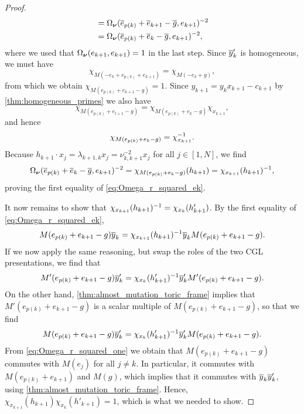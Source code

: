 \begin{proof}
\begin{align*}
		                                         & = \Omega_{\boldsymbol{\nu}}(\overline{e}_{p(k)} + \overline{e}_{k+1} - \overline{g}, e_{k+1})^{-2}        \\
		                                         & = \Omega_{\boldsymbol{\nu}}(\overline{e}_{p(k)} + \overline{e}_k - \overline{g}, e_{k+1})^{-2},
	\end{align*}
	where we used that $\Omega_{\boldsymbol{\nu}}(e_{k+1}, e_{k+1}) = 1$ in the last step. Since
	$\overline{y}'_k$ is homogeneous, we must have
	\begin{equation*}
		\chi_{M(-e_k + e_{p(k)} + e_{k+1})} = \chi_{M(-e_k + g)},
	\end{equation*}
	from which we obtain $\chi_{M(e_{p(k)} + e_{k+1} - g)} = 1$. Since $y_{k+1} = y_k
		x_{k+1} - c_{k+1}$ by \cref{thm:homogeneous_primes} we also have
	\begin{equation*}
		\chi_{M(e_{p(k)} + e_{l+1} -g)} = \chi_{M(e_{p(k)} + e_k - g)}\chi_{x_{k+1}},
	\end{equation*}
	and hence
	\begin{equation*}
		\chi_{M(e_{p(k)} + e_k - g)} = \chi_{x_{k+1}}^{-1}.
	\end{equation*}
	Because $h_{k+1} \cdot x_j = \lambda_{k+1, k} x_j = \nu_{k, k+1}^{-2}x_j$ for all $j
		\in [1, N]$, we find
	\begin{equation*}
		\Omega_{\boldsymbol{\nu}}(\overline{e}_{p(k)}+\overline{e}_k - \overline{g}, e_{k+1})^{-2} = \chi_{M(e_{p(k)} + e_k - g)}(h_{k+1}) = \chi_{x_{k+1}}(h_{k+1})^{-1},
	\end{equation*}
	proving the first equality of \cref{eq:Omega_r_squared_ek}.

	It now remains to show that $\chi_{x_{k+1}}(h_{k+1})^{-1} = \chi_{x_k}(h'_{k+1})$. By
	the first equality of \cref{eq:Omega_r_squared_ek},
	\begin{equation*}
		M(e_{p(k)} + e_{k+1} - g)\overline{y}_k = \chi_{x_{k+1}}(h_{k+1})^{-1} \overline{y}_k M(e_{p(k)} + e_{k+1} - g).
	\end{equation*}
	If we now apply the same reasoning, but swap the roles of the two CGL presentations, we
	find that
	\begin{equation*}
		M'(e_{p(k)} + e_{k+1} - g)\overline{y}'_k = \chi_{x_k}(h'_{k+1})^{-1} \overline{y}'_k M'(e_{p(k)} + e_{k+1} - g).
	\end{equation*}
	On the other hand, \cref{thm:almost_mutation_toric_frame} implies that $M'(e_{p(k)} +
		e_{k+1} - g)$ is a scalar multiple of $M(e_{p(k)} + e_{k+1} - g)$, so that we find
	\begin{equation*}
		M(e_{p(k)} + e_{k+1} - g)\overline{y}'_k = \chi_{x_k}(h'_{k+1})^{-1} \overline{y}'_k M(e_{p(k)} + e_{k+1} - g).
	\end{equation*}
	From \cref{eq:Omega_r_squared_one} we obtain that $M(e_{p(k)} + e_{k+1} - g)$ commutes
	with $M(e_j)$ for all $j \neq k$. In particular, it commutes with $M(e_{p(k)} +
		e_{k+1})$ and $M(g)$, which implies that it commutes with $\overline{y}_k \overline{y}'_k$, using
	\cref{thm:almost_mutation_toric_frame}. Hence,
	$\chi_{x_{k+1}}(h_{k+1})\chi_{x_k}(h'_{k+1}) = 1$, which is what we needed to show.

\end{proof}


